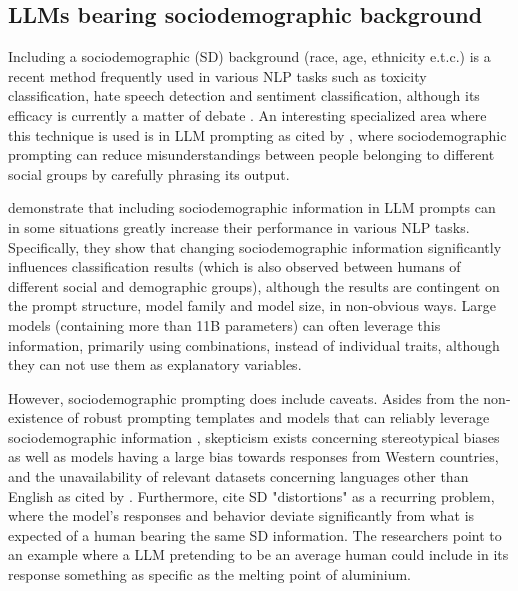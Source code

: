 \subsection{LLMs bearing sociodemographic background}
\label{sec:related:sociodemographic}

Including a sociodemographic (SD) background (race, age, ethnicity e.t.c.) is a recent method frequently used in various NLP tasks such as toxicity classification, hate speech detection and sentiment classification, although its efficacy is currently a matter of debate \cite{beck-etal-2024-sensitivity}. An interesting specialized area where this technique is used is in LLM prompting \cite{hwang-etal-2023-aligning, durmus2024measuringrepresentationsubjectiveglobal} as cited by \cite{beck-etal-2024-sensitivity}, where sociodemographic prompting can reduce misunderstandings between people belonging to different social groups by carefully phrasing its output. 

\cite{beck-etal-2024-sensitivity} demonstrate that including sociodemographic information in LLM prompts can in some situations greatly increase their performance in various NLP tasks. Specifically, they show that changing sociodemographic information significantly influences classification results (which is also observed between humans of different social and demographic groups), although the results are contingent on the prompt structure, model family and model size, in non-obvious ways. Large models (containing more than 11B parameters) can often leverage this information, primarily using combinations, instead of individual traits, although they can not use them as explanatory variables.

However, sociodemographic prompting does include caveats. Asides from the non-existence of robust prompting templates and models that can reliably leverage sociodemographic information \cite{beck-etal-2024-sensitivity}, skepticism exists concerning stereotypical biases \cite{cheng-etal-2023-marked, deshpande-etal-2023-toxicity} as well as models having a large bias towards responses from Western countries, and the unavailability of relevant datasets concerning languages other than English \cite{pmlr-v202-santurkar23a, durmus2024measuringrepresentationsubjectiveglobal, santy-etal-2023-nlpositionality} as cited by \cite{beck-etal-2024-sensitivity}. Furthermore, \cite{aher2023usinglargelanguagemodels} cite SD "distortions" as a recurring problem, where the model's responses and behavior deviate significantly from what is expected of a human bearing the same SD information. The researchers point to an example where a LLM pretending to be an average human could include in its response something as specific as the melting point of aluminium.

